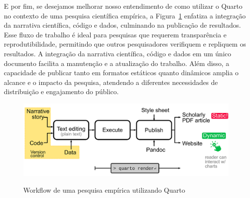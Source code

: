 \documentclass[
  a4paper,
]{book}
\begin{document}
E por fim, se desejamos melhorar nosso entendimento de como utilizar o
Quarto no contexto de uma pesquisa científica empírica, a
Figura~\ref{fig-all-workflow} enfatiza a integração da narrativa
científica, código e dados, culminando na publicação de resultados. Esse
fluxo de trabalho é ideal para pesquisas que requerem transparência e
reprodutibilidade, permitindo que outros pesquisadores verifiquem e
repliquem os resultados. A integração da narrativa científica, código e
dados em um único documento facilita a manutenção e a atualização do
trabalho. Além disso, a capacidade de publicar tanto em formatos
estáticos quanto dinâmicos amplia o alcance e o impacto da pesquisa,
atendendo a diferentes necessidades de distribuição e engajamento do
público.

\begin{figure}

\href{https://towardsdatascience.com/technical-writing-and-publishing-data-rich-articles-with-quarto-d61a56bcaa64}{\includegraphics{img/all-workflow.png}}

\caption{\label{fig-all-workflow}Workflow de uma pesquisa empírica
utilizando Quarto}

\end{figure}%
\end{document}
